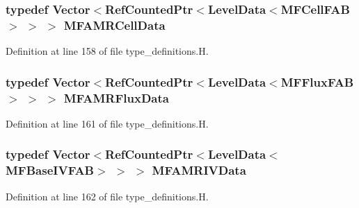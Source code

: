 \subsubsection[{\texorpdfstring{M\+F\+A\+M\+R\+Cell\+Data}{MFAMRCellData}}]{\setlength{\rightskip}{0pt plus 5cm}typedef Vector$<$Ref\+Counted\+Ptr$<$Level\+Data$<$M\+F\+Cell\+F\+AB$>$ $>$ $>$ {\bf M\+F\+A\+M\+R\+Cell\+Data}}\hypertarget{type__definitions_8H_aced885351d40daa466564acbee4042d3}{}\label{type__definitions_8H_aced885351d40daa466564acbee4042d3}


Definition at line 158 of file type\+\_\+definitions.\+H.

\subsubsection[{\texorpdfstring{M\+F\+A\+M\+R\+Flux\+Data}{MFAMRFluxData}}]{\setlength{\rightskip}{0pt plus 5cm}typedef Vector$<$Ref\+Counted\+Ptr$<$Level\+Data$<$M\+F\+Flux\+F\+AB$>$ $>$ $>$ {\bf M\+F\+A\+M\+R\+Flux\+Data}}\hypertarget{type__definitions_8H_a4033d82364b7e6655b58257749d7881f}{}\label{type__definitions_8H_a4033d82364b7e6655b58257749d7881f}


Definition at line 161 of file type\+\_\+definitions.\+H.

\subsubsection[{\texorpdfstring{M\+F\+A\+M\+R\+I\+V\+Data}{MFAMRIVData}}]{\setlength{\rightskip}{0pt plus 5cm}typedef Vector$<$Ref\+Counted\+Ptr$<$Level\+Data$<${\bf M\+F\+Base\+I\+V\+F\+AB}$>$ $>$ $>$ {\bf M\+F\+A\+M\+R\+I\+V\+Data}}\hypertarget{type__definitions_8H_a559707b00625e419df1a59d9501220de}{}\label{type__definitions_8H_a559707b00625e419df1a59d9501220de}


Definition at line 162 of file type\+\_\+definitions.\+H.

